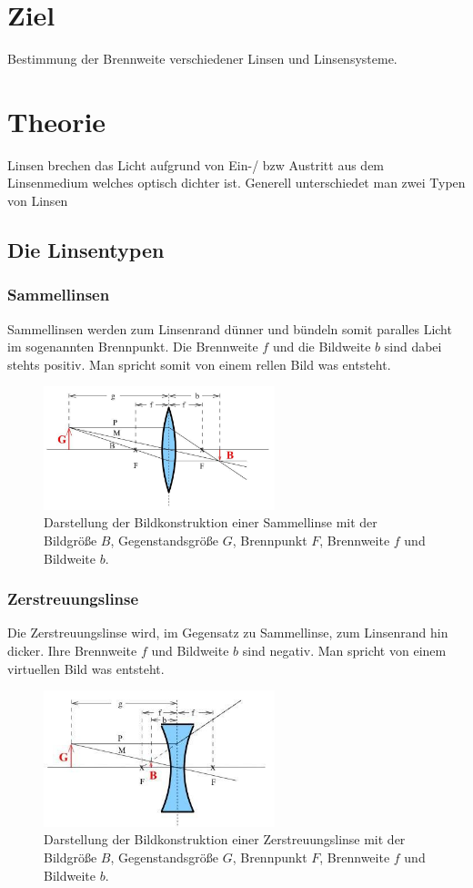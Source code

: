 \section{Ziel}
Bestimmung der Brennweite verschiedener Linsen und Linsensysteme.
\section{Theorie}
Linsen brechen das Licht aufgrund von Ein-/ bzw Austritt aus dem Linsenmedium welches optisch dichter ist.
Generell unterschiedet man zwei Typen von Linsen
\subsection{Die Linsentypen}
\subsubsection*{Sammellinsen}
Sammellinsen werden zum Linsenrand dünner und bündeln somit paralles Licht im sogenannten Brennpunkt.
Die Brennweite $f$ und die Bildweite $b$ sind dabei stehts positiv.
Man spricht somit von einem rellen Bild was entsteht.
\begin{figure}[H]
    \centering
    \includegraphics[width=0.6\textwidth]{bilder/sammellinse.jpg}
    \caption{Darstellung der Bildkonstruktion einer Sammellinse mit der Bildgröße $B$,
    Gegenstandsgröße $G$, Brennpunkt $F$, Brennweite $f$ und Bildweite $b$.\cite[1]{anleitung}}
\end{figure}

\subsubsection*{Zerstreuungslinse}
Die Zerstreuungslinse wird, im Gegensatz zu Sammellinse, zum Linsenrand hin dicker.
Ihre Brennweite $f$ und Bildweite $b$ sind negativ. Man spricht von einem virtuellen Bild was entsteht.
\begin{figure}[H]
    \centering
    \includegraphics[width=0.6\textwidth]{bilder/zerlinse.jpg}
    \caption{Darstellung der Bildkonstruktion einer Zerstreuungslinse mit der Bildgröße $B$,
    Gegenstandsgröße $G$, Brennpunkt $F$, Brennweite $f$ und Bildweite $b$.\cite[1]{anleitung}}
\end{figure}


